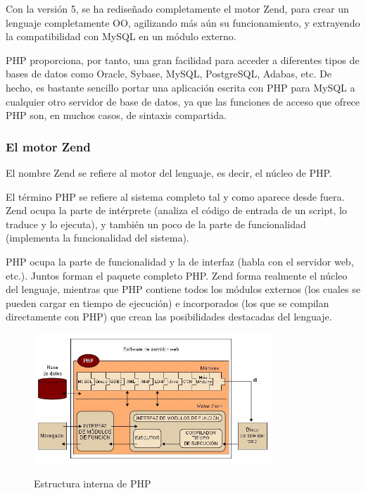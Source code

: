 Con la versión 5, se ha rediseñado completamente el motor Zend, para crear un lenguaje completamente OO, agilizando más aún su funcionamiento, y extrayendo la compatibilidad con MySQL en un módulo externo.

PHP proporciona, por tanto, una gran facilidad para acceder a diferentes tipos de bases de datos como Oracle, Sybase, MySQL, PostgreSQL, Adabas, etc. De hecho, es bastante sencillo portar una aplicación escrita con PHP para MySQL
a cualquier otro servidor de base de datos, ya que las funciones de acceso que ofrece PHP son, en muchos casos, de sintaxis compartida.

\subsubsection{El motor Zend}
El nombre Zend se refiere al motor del lenguaje, es decir, el núcleo de PHP.

El término PHP se refiere al sistema completo tal y como aparece desde fuera. Zend ocupa la parte de intérprete (analiza el código de entrada de un script, lo traduce y lo ejecuta), y también un poco de la parte de funcionalidad (implementa la funcionalidad del sistema). 

PHP ocupa la parte de funcionalidad y la de interfaz (habla con el servidor web, etc.). Juntos forman el paquete completo PHP. Zend forma realmente el núcleo del lenguaje, mientras que PHP contiene todos los módulos externos (los cuales se pueden cargar en tiempo de ejecución) e incorporados (los que se compilan directamente con PHP) que crean las posibilidades destacadas del lenguaje.

\begin{figure}[htp]
    \centering
    \includegraphics[width=0.8\textwidth]{imagenes/estructura_php.jpg}
    \label{fig:estructuraphp}
    \caption{Estructura interna de PHP}
\end{figure}



